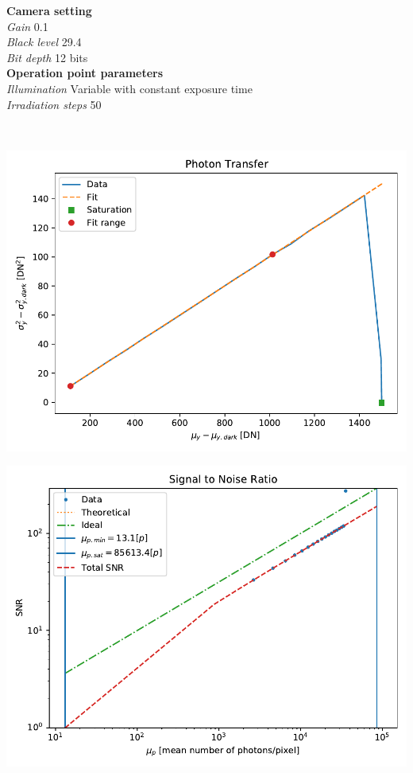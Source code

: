 \documentclass[a4paper,twoside,12pt,american,hidelinks]{article}
\begin{document}
\begin{minipage}[t]{0.975\linewidth}
\begin{multicols}{2}
\textbf{Camera setting} \hfill
\\[1mm]
\textsl{Gain} \hfill 0.1
\\[1mm]
\textsl{Black level} \hfill 29.4
\\[1mm]
\textsl{Bit depth} \hfill 12 bits
\\[1mm]
\textbf{Operation point parameters}
\\[1mm]
\textsl{Illumination} \hfill Variable with constant exposure time
\\[1mm]
\textsl{Irradiation steps} \hfill 50
\\[1mm]
\end{multicols}
\end{minipage}
\\[10mm]
\begin{minipage}[t]{0.690\linewidth}

\includegraphics[width=0.95\linewidth,keepaspectratio]{OP1/PlotPTC.pdf}

\includegraphics[width=0.95\linewidth,keepaspectratio]{OP1/PlotSNR.pdf}
\end{minipage}
\end{document}

